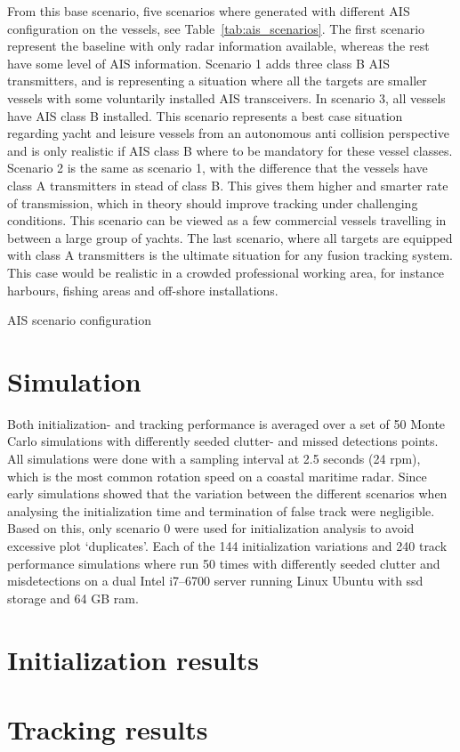 From this base scenario, five scenarios where generated with different AIS configuration on the vessels, see Table~\ref{tab:ais_scenarios}. The first scenario represent the baseline with only radar information available, whereas the rest have some level of AIS information. Scenario 1 adds three class B AIS transmitters, and is representing a situation where all the targets are smaller vessels with some voluntarily installed AIS transceivers. In scenario 3, all vessels have AIS class B installed. This scenario represents a best case situation regarding yacht and leisure vessels from an autonomous anti collision perspective and is only realistic if AIS class B where to be mandatory for these vessel classes. Scenario 2 is the same as scenario 1, with the difference that the vessels have class A transmitters in stead of class B. This gives them higher and smarter rate of transmission, which in theory should improve tracking under challenging conditions. This scenario can be viewed as a few commercial vessels travelling in between a large group of yachts. The last scenario, where all targets are equipped with class A transmitters is the ultimate situation for any fusion tracking system. This case would be realistic in a crowded professional working area, for instance harbours, fishing areas and off-shore installations.
\begin{table}
\centering
{}
\caption{AIS scenario configuration}\label{tab:ais_scenarios}
\end{table}

\section{Simulation}
Both initialization- and tracking performance is averaged over a set of 50 Monte Carlo simulations with differently seeded clutter- and missed detections points. All simulations were done with a sampling interval at 2.5 seconds (24 \gls{rpm}), which is the most common rotation speed on a coastal maritime radar. Since early simulations showed that the variation between the different scenarios when analysing the initialization time and termination of false track were negligible. Based on this, only scenario 0 were used for initialization analysis to avoid excessive plot `duplicates'. Each of the 144 initialization variations and 240 track performance simulations where run 50 times with differently seeded clutter and misdetections on a dual Intel i7--6700 server running Linux Ubuntu with \gls{ssd} storage and 64 GB \gls{ram}.

\section{Initialization results}




\section{Tracking results}

